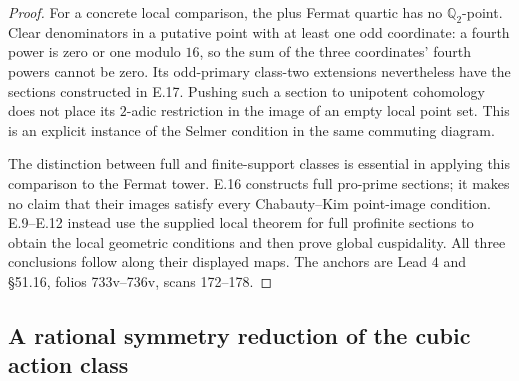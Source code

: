 \documentclass[11pt,oneside]{article}
\begin{document}
\begin{proof}
For a concrete local comparison, the
plus Fermat quartic has no
$\mathbb Q_2$-point. Clear denominators
in a putative point with at least one
odd coordinate: a fourth power is
zero or one modulo $16$, so the sum
of the three coordinates' fourth
powers cannot be zero. Its odd-primary
class-two extensions nevertheless have
the sections constructed in E.17.
Pushing such a section to unipotent
cohomology does not place its
$2$-adic restriction in the image
of an empty local point set. This
is an explicit instance of the
Selmer condition in the same
commuting diagram.

The distinction between full and
finite-support classes is essential
in applying this comparison to the
Fermat tower. E.16 constructs full
pro-prime sections; it makes no
claim that their images satisfy
every Chabauty--Kim point-image
condition. E.9--E.12 instead use
the supplied local theorem for
full profinite sections to obtain
the local geometric conditions and
then prove global cuspidality.
All three conclusions follow along
their displayed maps. The anchors
are Lead 4 and \S51.16, folios
733v--736v, scans 172--178.
\end{proof}


\subsection{A rational symmetry reduction of the cubic action class}
\end{document}

